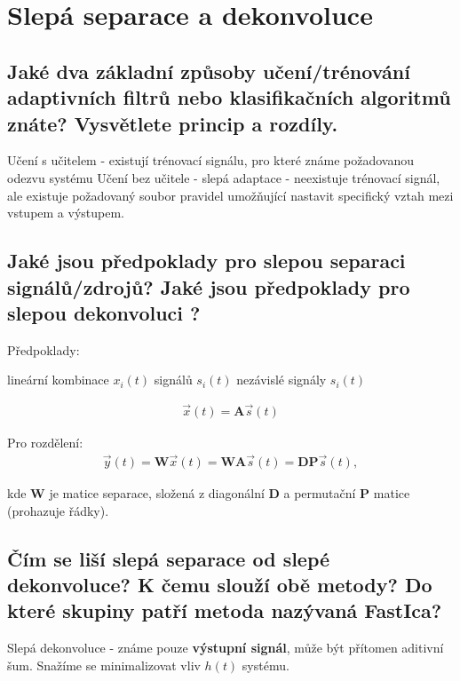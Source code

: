 \documentclass[a4paper,12pt]{article}   %
\newcommand{\mt}[1]{$#1$}
\begin{document}
\newpage \section{Slepá separace a dekonvoluce}

\subsection{Jaké dva základní způsoby učení/trénování adaptivních filtrů nebo klasifikačních algoritmů znáte? Vysvětlete princip a rozdíly.}

\begin{outline}
        \1 Učení s učitelem - existují trénovací signálu, pro které známe požadovanou odezvu systému
        \1 Učení bez učitele - slepá adaptace - neexistuje trénovací signál, ale existuje požadovaný soubor pravidel umožňující nastavit specifický vztah mezi vstupem a výstupem. 
\end{outline}


\subsection{Jaké jsou předpoklady pro slepou separaci signálů/zdrojů? Jaké jsou předpoklady pro slepou dekonvoluci ?}

Předpoklady:
\begin{outline}
        \1 lineární kombinace \mt{x_i(t)} signálů \mt{s_i(t)}
        \1 nezávislé signály \mt{s_i(t)}
\end{outline}
\begin{align*}
        \vec{x}(t) = \pmb A \vec s(t)
\end{align*}

Pro rozdělení:
\begin{align*}
        \vec{y}(t) = \pmb W \vec x(t) =  \pmb W\pmb A \vec s(t) = \pmb D \pmb P \vec s(t),
\end{align*}

kde \mt{\pmb W} je matice separace, složená z diagonální \mt{\pmb D} a permutační \mt{\pmb P} matice (prohazuje řádky). 

\subsection{Čím se liší slepá separace od slepé dekonvoluce? K čemu slouží obě metody? Do které skupiny patří metoda nazývaná FastIca?}

Slepá dekonvoluce - známe pouze \textbf{výstupní signál}, může být přítomen aditivní šum. Snažíme se minimalizovat vliv \mt{h(t)} systému. 
\end{document}
